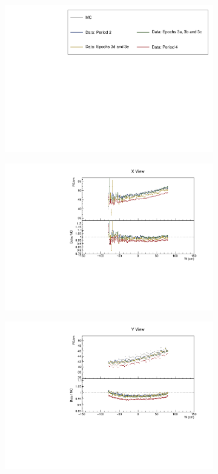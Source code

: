 \documentclass[12pt,a4paper]{article}
\begin{document}
\begin{figure}[h!]
  \begin{subfigure}{\textwidth}
  \centering
    \includegraphics[height=0.2\linewidth]{essentialsec_tb/legend.pdf}
  \end{subfigure}
  \vspace*{2mm}
  
  \begin{subfigure}{0.5\textwidth}
    \includegraphics[width=\linewidth]{essentialsec_tb/pecm_w_x.pdf}
  \end{subfigure}
  \begin{subfigure}{0.5\textwidth}
    \includegraphics[width=\linewidth]{essentialsec_tb/pecm_w_y.pdf}

\end{subfigure}
\end{figure}
\end{document}
